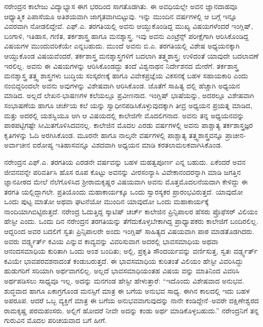 ನರೇಂದ್ರನ ಕಾಲೇಜು ವಿದ್ಯಾಭ್ಯಾಸ ಈಗ ಭರದಿಂದ ಸಾಗತೊಡಗಿತು. ಈ ಅವಧಿಯಲ್ಲೇ ಅವನ ಜ್ಞಾನದಾಹವೂ ಆಧ್ಯಾತ್ಮಿಕ ಪಿಪಾಸೆಯೂ ಅತಿಶಯವಾಗಿ ಜಾಗೃತವಾಗಿಬಿಟ್ಟುವು. ಇನ್ನು ಮುಂದಿನ ವರ್ಷಗಳಲ್ಲಿ ಆ ಬಗ್ಗೆ ಇನ್ನೂ ವಿವರವಾಗಿ ನೋಡಲಿದ್ದೇವೆ. ಎಫ್.ಎ. ತರಗತಿಯಲ್ಲಿ ಅವನು ಆಯ್ದುಕೊಂಡಿದ್ದ ಮುಖ್ಯ ವಿಷಯಗಳೆಂದರೆ ಇಂಗ್ಲಿಷ್, ಬಂಗಾಳಿ, ಇತಿಹಾಸ, ಗಣಿತ, ತರ್ಕಶಾಸ್ತ್ರ ಹಾಗೂ ಮನಶ್ಶಾಸ್ತ್ರ. ಇವು ಅವನು ಎಂಟ್ರೆನ್ಸ್ ಪರೀಕ್ಷೆಗಾಗಿ ಆರಿಸಿಕೊಂಡಿದ್ದ ವಿಷಯಗಳ ಮುಂದುವರಿಕೆಯೇ ಎನ್ನಬಹುದು. ಮುಂದೆ ಅವನು ಬಿ.ಎ. ತರಗತಿಯಲ್ಲಿ ವಿಶೇಷ ಅಧ್ಯಯನಕ್ಕಾಗಿ ಆಯ್ದುಕೊಂಡ ವಿಷಯವೆಂದರೆ, ತರ್ಕಶಾಸ್ತ್ರ ಮನಶ್ಶಾಸ್ತ್ರಗಳಿಗೆ ಬದಲಾಗಿ ತತ್ತ್ವಶಾಸ್ತ್ರ; ಉಳಿದಂತೆ ಯಾವುದೇ ಬದಲಾವಣೆ ಇರಲಿಲ್ಲ. ಅವನು ಈ ವಿಷಯಗಳನ್ನು ಆರಿಸಿಕೊಂಡದ್ದು ತಂದೆ ವಿಶ್ವನಾಥನ ನಿರ್ದೇಶನದ ಮೇರೆಗೆ. ತರ್ಕಶಾಸ್ತ್ರ ಮನಶ್ಶಾಸ್ತ್ರ ತತ್ತ್ವ ಶಾಸ್ತ್ರಗಳು ಬುದ್ಧಿಯ ಸಂಸ್ಕರಣಕ್ಕೆ ಹಾಗೂ ವಿವೇಕಪ್ರಜ್ಞೆಯ ವಿಕಸನಕ್ಕೆ ಬಹಳ ಸಹಾಯಕಾರಿ ಎಂದು ನಂಬಿದ್ದರಿಂದಲೇ ಅವನು ಅವುಗಳನ್ನು ವಿಶೇಷವಾಗಿ ಆರಿಸಿಕೊಂಡ. ಜೊತೆಗೆ ಸಾಹಿತ್ಯ ದಲ್ಲಿ ಹೆಚ್ಚಾಗಿ ಅಧ್ಯಯನ ಮಾಡಿದ. ಅಲ್ಲದೆ ಲೇಖನ-ಭಾಷಣಗಳ ಕಲೆಯಲ್ಲೂ ಪ್ರವೀಣನಾದ. ಇಂಗ್ಲಿಷ್ ಭಾಷೆಯನ್ನು, ಅದರಲ್ಲೂ ವಿಶೇಷವಾಗಿ ಸಂಭಾಷಣೆಯ ಹಾಗೂ ಚರ್ಚೆಯ ಕಲೆ ಯನ್ನು ಸ್ವಾಧೀನಪಡಿಸಿಕೊಳ್ಳುವುದಕ್ಕಾಗಿ ತೀವ್ರ ಅಧ್ಯಯನ ಪ್ರಯತ್ನ ಮಾಡಿದ, ಮತ್ತು ಅದರಲ್ಲಿ ಯಶಸ್ವಿಯೂ ಆಗಿ ಆ ವಿಷಯದಲ್ಲಿ ಕಾಲೇಜಿಗೇ ಮೊದಲಿಗನಾದ. ಅವನು ತನ್ನ ಅಧ್ಯಯನವನ್ನು ಪಾಠಪಟ್ಟಿಗಷ್ಟೇ ಸೀಮಿತಗೊಳಿಸಿದವನಲ್ಲ. ಕಾಲೇಜಿನ ಮೊದಲ ಎರಡು ವರ್ಷಗಳಲ್ಲಿ ಅವನು ಪಾಶ್ಚಾತ್ಯ ತರ್ಕಶಾಸ್ತ್ರಜ್ಞರ ಕೃತಿಗಳನ್ನು ಓದಿ ಅರಗಿಸಿಕೊಂಡ. ಮೂರನೇ ಹಾಗೂ ನಾಲ್ಕನೇ ವರ್ಷಗಳಲ್ಲಿ ಪಾಶ್ಚಾತ್ಯ ತತ್ತ್ವಶಾಸ್ತ್ರವನ್ನೂ ಪ್ರಾಚೀನ-ಅರ್ವಾಚೀನ ಐರೋಪ್ಯ ಇತಿಹಾಸವನ್ನೂ ವಿಶದವಾಗಿ ಅಧ್ಯಯನ ಮಾಡಿ ಕರತಲಾಮಲಕವಾಗಿಸಿಕೊಂಡ.

ನರೇಂದ್ರನ ಎಫ್.ಎ. ತರಗತಿಯ ಎರಡನೇ ವರ್ಷವನ್ನು ಬಹಳ ಮಹತ್ವಪೂರ್ಣ ಎನ್ನ ಬಹುದು. ಏಕೆಂದರೆ ಅವನ ಜೀವನವನ್ನೇ ಪರಿವರ್ತಿಸಿ ಹೊಸ ರೂಪ ಕೊಟ್ಟು ಅವನನ್ನು ವೀರಸಂನ್ಯಾಸಿ ವಿವೇಕಾನಂದರನ್ನಾಗಿ ಮಾಡಿ ಜಗತ್ತಿನ ಜ್ಞಾನಪೀಠದ ಮೇಲೆ ನೆಲೆಗೊಳಿಸಿದ ಶ್ರೀರಾಮಕೃಷ್ಣರ ವಿಷಯವಾಗಿ ಅವನು ಮೊತ್ತಮೊದಲನೆಯದಾಗಿ ಕೇಳಿದ್ದು ಈ ತರಗತಿ ಯಲ್ಲಿದ್ದಾಗಲೇ. ಪ್ರತಿಯೊಂದು ಮಹಾಕಾರ್ಯಕ್ಕೂ ಒಂದು ಸ್ವಾರಸ್ಯಕರ ಪ್ರಾರಂಭವಿರುತ್ತದೆ. ಯಾವುದೋ ಒಂದು ಪುಟ್ಟ ಮಾತೋ ಅಥವಾ ಘಟನೆಯೋ ಮುಂದಿನ ಯಾವುದೋ ಒಂದು ಮಹಾಕಾರ್ಯಕ್ಕೆ ನಾಂದಿಯಾಗಿಬಿಟ್ಟಿರುತ್ತದೆ. ನರೇಂದ್ರ ಓದುತ್ತಿದ್ದ ಸ್ಕಾಟಿಷ್ ಚರ್ಚ್ ಕಾಲೇಜಿನ ಪ್ರಿನ್ಸಿಪಾಲರ ಹೆಸರು ಪ್ರೊಫೆಸರ್ ವಿಲಿಯಂ ಹೇಸ್ಟೀ ಎಂದು. ಒಂದು ದಿನ ನರೇಂದ್ರನ ತರಗತಿಯನ್ನು ತೆಗೆದುಕೊಳ್ಳಬೇಕಾಗಿದ್ದ ಪ್ರಾಧ್ಯಾಪಕರು ಕಾಲೇಜಿಗೆ ಬಂದಿರಲಿಲ್ಲ. ಆದ್ದರಿಂದ ಅವರ ಬದಲಿಗೆ ಸ್ವತಃ ಪ್ರಿನ್ಸಿಪಾಲರೇ ಅಂದು ಇಂಗ್ಲಿಷ್ ಸಾಹಿತ್ಯದ ವಿಷಯವಾಗಿ ಪಾಠ ಮಾಡತೊಡಗಿದರು. ಅವರು ವರ್ಡ್ಸ್ವರ್ತ್ ಕವಿಯ  ಎನ್ನುವ ಕಾವ್ಯವನ್ನು ವಿವರಿಸುವಾಗ ಅದರಲ್ಲಿ ಭಾವಸಮಾಧಿಯ ಅಥವಾ ಆನಂದಸಮಾಧಿಯ ಕುರಿತಾಗಿ ಒಂದು ಅಂಶ ಬಂದಿತು; ಅಲ್ಲಿ, ಪ್ರಕೃತಿ ಸೌಂದರ್ಯವನ್ನು ವರ್ಣಿಸುತ್ತ, ಸ್ವತಃ ವರ್ಡ್ಸ್ವರ್ತ್ ಕವಿಯೇ ಭಾವಪರವಶನಾದಂತೆ ಕಂಡುಬರುತ್ತದೆ. ಈ ಭಾವಸಮಾಧಿಯ ಕುರಿತಂತೆ ವಿಲಿಯಂ ಹೇಸ್ಟೀ ವಿವರಿಸಿದ್ದು ಹುಡುಗರಿಗೆ ಸರಿಯಾಗಿ ಅರ್ಥವಾಗಲಿಲ್ಲ. ಅಲ್ಲದೆ ಭಾವಸಮಾಧಿಯಂತಹ ವಿಷಯ ವನ್ನು ಮಾತಿನಿಂದ ವಿವರಿಸಿ ಅರ್ಥಪಡಿಸಲು ಸಾಧ್ಯವೂ ಇಲ್ಲ. ಅದನ್ನು ಮನಗಂಡ ಹೇಸ್ಟೀ ಹೇಳುತ್ತಾರೆ: “ಇದೊಂದು ವಿಶೇಷವಾದ ಅನುಭವ. ಶುದ್ಧವಾದ ಹಾಗೂ ಏಕಾಗ್ರಗೊಂಡ ಮನಸ್ಸಿಗೆ ಮಾತ್ರ ಈ ಬಗೆಯ ಅನುಭವ ಸಾಧ್ಯ. ಈಗಿನ ಕಾಲದಲ್ಲಿ ಇದು ಬಹಳ ಅಪರೂಪ. ಆದರೆ ಒಬ್ಬ ವ್ಯಕ್ತಿಗೆ ಮಾತ್ರ ಈ ಬಗೆಯ ಅನುಭವವಾಗುವುದನ್ನು ನಾನೇ ಕಂಡಿದ್ದೇನೆ–ಅವರೇ ದಕ್ಷಿಣೇಶ್ವರದ ರಾಮಕೃಷ್ಣ ಪರಮಹಂಸರು. ಅಲ್ಲಿಗೆ ಹೋದರೆ ನೀವೇ ಅದನ್ನು ಕಂಡು ಅರ್ಥ ಮಾಡಿಕೊಳ್ಳಬಹುದು.” ನರೇಂದ್ರನಿಗೆ ತನ್ನ ಗುರುವಿನ ಮೊದಲ ಪರಿಚಯವಾದ ಬಗೆ ಹೀಗೆ.

